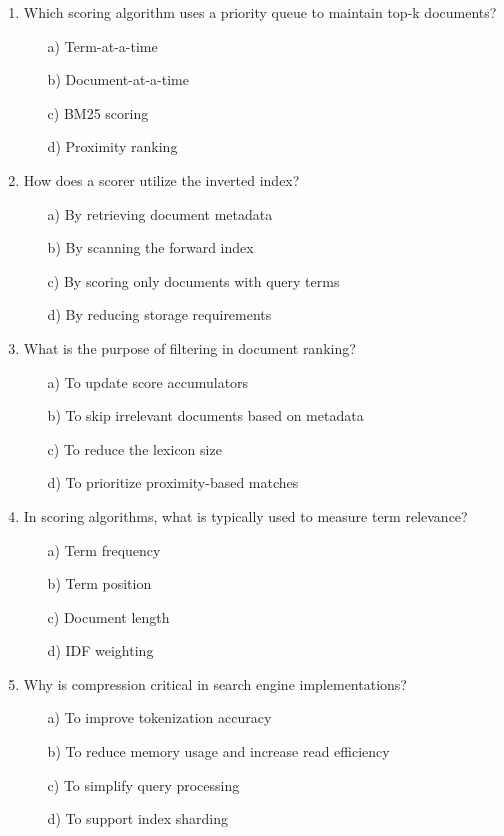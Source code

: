 \documentclass[8pt]{extarticle}
\begin{document}
\begin{multicols}{2}
\begin{enumerate}
\item Which scoring algorithm uses a priority queue to maintain top-k documents?
\begin{itemize}
\item[a)] Term-at-a-time
\item[b)] Document-at-a-time
\item[c)] BM25 scoring
\item[d)] Proximity ranking
\end{itemize}

\item How does a scorer utilize the inverted index?
\begin{itemize}
\item[a)] By retrieving document metadata
\item[b)] By scanning the forward index
\item[c)] By scoring only documents with query terms
\item[d)] By reducing storage requirements
\end{itemize}

\item What is the purpose of filtering in document ranking?
\begin{itemize}
\item[a)] To update score accumulators
\item[b)] To skip irrelevant documents based on metadata
\item[c)] To reduce the lexicon size
\item[d)] To prioritize proximity-based matches
\end{itemize}

\item In scoring algorithms, what is typically used to measure term relevance?
\begin{itemize}
\item[a)] Term frequency
\item[b)] Term position
\item[c)] Document length
\item[d)] IDF weighting
\end{itemize}

\item Why is compression critical in search engine implementations?
\begin{itemize}
\item[a)] To improve tokenization accuracy
\item[b)] To reduce memory usage and increase read efficiency
\item[c)] To simplify query processing
\item[d)] To support index sharding
\end{itemize}


\end{enumerate}
\end{multicols}
\end{document}
